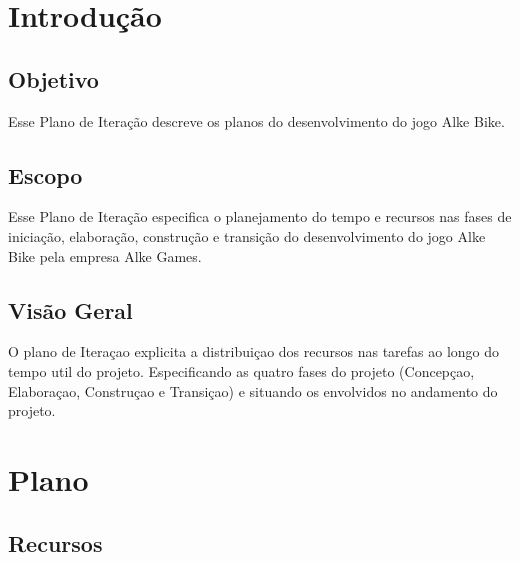 \section{Introdução} 
\subsection{Objetivo}

Esse Plano de Iteração descreve os planos do desenvolvimento do jogo Alke Bike.

\subsection{Escopo}

Esse Plano de Iteração especifica o planejamento do tempo e recursos nas fases de iniciação, elaboração, construção e transição do desenvolvimento do jogo Alke Bike pela empresa Alke Games.

\subsection{Visão Geral}

O plano de Iteraçao explicita a distribuiçao dos recursos nas tarefas ao longo do tempo util do projeto. Especificando as quatro fases do projeto (Concepçao, Elaboraçao, Construçao e Transiçao) e situando os envolvidos no andamento do projeto.

\section{Plano}

\subsection{Recursos}

